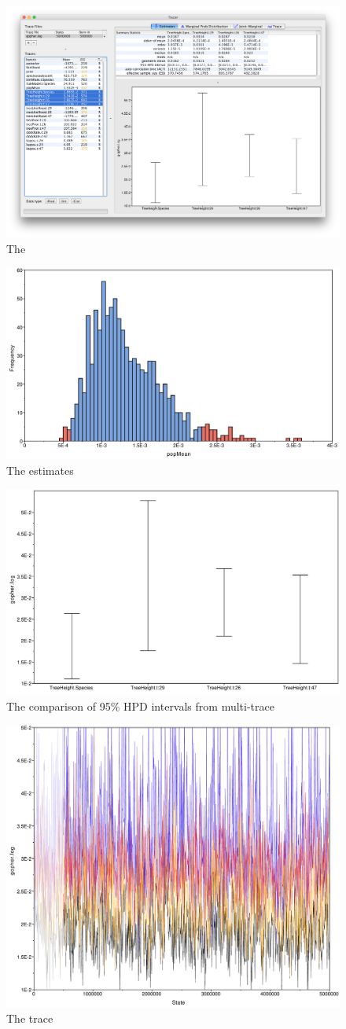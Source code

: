 \documentclass{bioinfo}
\begin{document}

\begin{figure}[H]
\includegraphics[width=.5\textwidth]{./figures/gopher-log.png}  
\caption{The }
\label{fig:front:page}
\end{figure}

\begin{figure}[H]
\includegraphics[width=.5\textwidth]{./figures/estimates.pdf}  
\caption{The estimates}
\label{fig:estimates}
\end{figure}

\begin{figure}[H]
\includegraphics[width=.5\textwidth]{./figures/comp-95HPD.pdf}  
\caption{The comparison of  95\% HPD intervals from multi-trace}
\label{fig:comp95HPD}
\end{figure}

\begin{figure}[H]
\includegraphics[width=.5\textwidth]{./figures/trace.pdf}  
\caption{The trace}
\label{fig:trace}
\end{figure}
\end{document}

